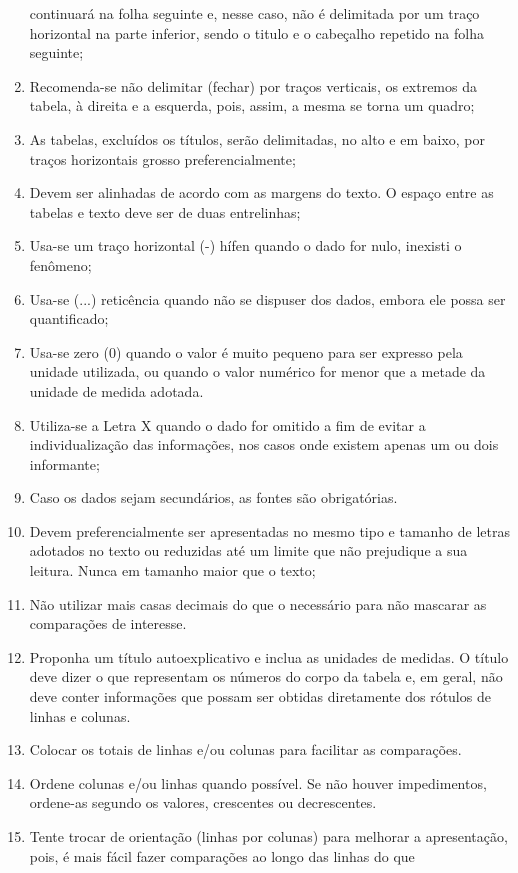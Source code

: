 \begin{enumerate}
continuará na folha seguinte e, nesse caso, não é delimitada por
um traço horizontal na parte inferior, sendo o titulo e o
cabeçalho repetido na folha seguinte; 
\item Recomenda-se não
delimitar (fechar) por traços verticais, os extremos da tabela, à
direita e a esquerda, pois, assim, a mesma se torna um quadro;
\item As tabelas, excluídos os títulos, serão delimitadas, no alto e em baixo, por traços horizontais grosso preferencialmente;
\item Devem ser alinhadas de acordo com as margens do texto. O espaço entre as tabelas e texto deve ser de duas entrelinhas;
\item Usa-se um traço horizontal (-) hífen quando o dado for nulo, inexisti o fenômeno; 
\item Usa-se (...) reticência quando não se dispuser dos dados,
embora ele possa ser quantificado; 
\item Usa-se zero (0) quando o valor é muito pequeno para ser expresso pela unidade utilizada, ou quando o valor numérico for menor que a metade da unidade de medida adotada.
\item Utiliza-se a Letra X quando o dado for omitido
a fim de evitar a individualização das
informações, nos casos onde existem
apenas um ou dois informante;
\item Caso os dados sejam secundários, as fontes são obrigatórias.
\item Devem preferencialmente ser apresentadas no mesmo tipo e tamanho de letras adotados no texto ou reduzidas até um limite que não prejudique a sua leitura. Nunca em tamanho maior que o texto;
\item Não utilizar mais casas decimais do que o necessário para
não mascarar as comparações de interesse. 
\item Proponha um título
autoexplicativo e inclua as unidades de medidas. O título deve
dizer o que representam os números do corpo da tabela e, em geral,
não deve conter informações que possam ser obtidas diretamente dos
rótulos de linhas e colunas. 
\item Colocar os totais de linhas
e/ou colunas para facilitar as comparações. 
\item Ordene colunas
e/ou linhas quando possível. Se não houver impedimentos, ordene-as
segundo os valores, crescentes ou decrescentes. 
\item Tente trocar
de orientação (linhas por colunas) para melhorar a apresentação,
pois, é mais fácil fazer comparações ao longo das linhas do que

\end{enumerate}
